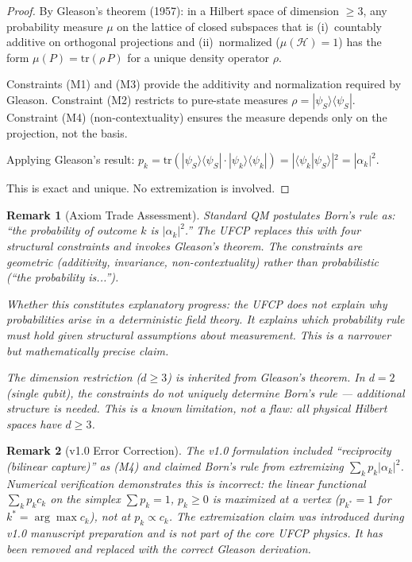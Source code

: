 \documentclass[11pt, a4paper]{article}
\newtheorem{remark}{Remark}[section]
\begin{document}
\begin{proof}[Proof]
By Gleason's theorem (1957): in a Hilbert space of dimension $\geq 3$,
any probability measure $\mu$ on the lattice of closed subspaces that is
(i)~countably additive on orthogonal projections and (ii)~normalized
($\mu(\mathcal{H}) = 1$) has the form $\mu(P) = \mathrm{tr}(\rho\, P)$
for a unique density operator $\rho$.

Constraints (M1) and (M3) provide the additivity and normalization
required by Gleason. Constraint (M2) restricts to pure-state measures
$\rho = |\psi_S\rangle\langle\psi_S|$. Constraint (M4) (non-contextuality)
ensures the measure depends only on the projection, not the basis.

Applying Gleason's result:
$p_k = \mathrm{tr}(|\psi_S\rangle\langle\psi_S|\cdot|\psi_k\rangle\langle\psi_k|)
= |\langle\psi_k|\psi_S\rangle|^2 = |\alpha_k|^2$.

This is exact and unique. No extremization is involved.
\end{proof}

\begin{remark}[Axiom Trade Assessment]
Standard QM postulates Born's rule as: ``the probability of outcome $k$
is $|\alpha_k|^2$.'' The UFCP replaces this with four structural
constraints and invokes Gleason's theorem. The constraints are geometric
(additivity, invariance, non-contextuality) rather than probabilistic
(``the probability is...'').

Whether this constitutes explanatory progress: the UFCP does not explain
\textit{why} probabilities arise in a deterministic field theory. It
explains \textit{which} probability rule must hold given structural
assumptions about measurement. This is a narrower but mathematically
precise claim.

The dimension restriction ($d \geq 3$) is inherited from Gleason's
theorem. In $d = 2$ (single qubit), the constraints do not uniquely
determine Born's rule --- additional structure is needed. This is a
known limitation, not a flaw: all physical Hilbert spaces have $d \geq 3$.
\end{remark}

\begin{remark}[v1.0 Error Correction]
The v1.0 formulation included ``reciprocity (bilinear capture)'' as (M4)
and claimed Born's rule from extremizing $\sum_k p_k |\alpha_k|^2$.
Numerical verification demonstrates this is incorrect: the linear
functional $\sum_k p_k c_k$ on the simplex $\sum p_k = 1$, $p_k \geq 0$
is maximized at a vertex ($p_{k^*} = 1$ for $k^* = \arg\max c_k$), not at
$p_k \propto c_k$. The extremization claim was introduced during v1.0
manuscript preparation and is not part of the core UFCP physics. It has
been removed and replaced with the correct Gleason derivation.
\end{remark}
\end{document}
